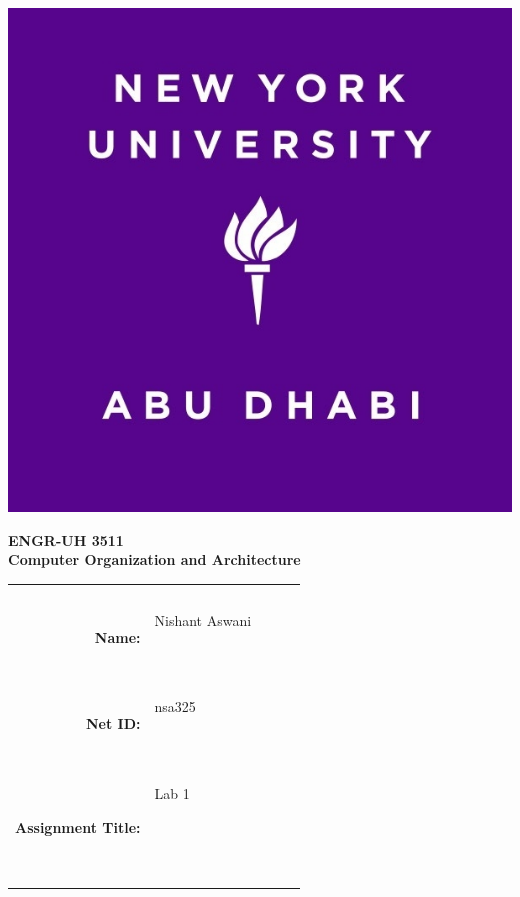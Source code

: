 \documentclass[twocolumn]{article}
\title{\myassignmenttitle}
\author{\myname, \myemail}
\affil{\myclassname (\mycoursenumber), Instructor \myinstructor}
\date{}
\newcommand{\myname}{Nishant Aswani}
\newcommand{\mynetid}{nsa325}
\newcommand{\myhwtype}{Lab }
\newcommand{\myhwnum}{1}
\newcommand{\mycoursenumber}{ENGR-UH 3511}
\newcommand{\myclassname}{Computer Organization and Architecture}
\begin{document}
\onecolumn
\pagestyle{fancy}
\fancyhf{}
\renewcommand{\headrulewidth}{0pt}

\begin{center}
  \includegraphics[scale=0.15]{etc/NYUAD-alt-logo.jpg}
\end{center}

{\vspace{2.5em}}

\begin{center}
    \Huge{\textbf{\mycoursenumber}}\\
    {\vspace{0.5em}}
    \Huge{\textbf{\myclassname}}
\end{center}

{\vspace{10em}}

\begin{center}
  \begin{tabular}{|rp{5.0cm}lll|}
    \hline
    &  &  &  & \\
    &  &  &  & \\
    \Large{\textbf{Name:}} & \Large{\myname}
    
    \  &  &  & \\
    \Large{\textbf{Net ID:}} & \Large{\mynetid}
    
    \  &  &  & \\
    \Large{\textbf{Assignment Title:}} & \Large{\myhwtype \myhwnum}
    
    \
    
    \  &  &  & \\
    \hline
  \end{tabular}
\end{center}
\end{document}
